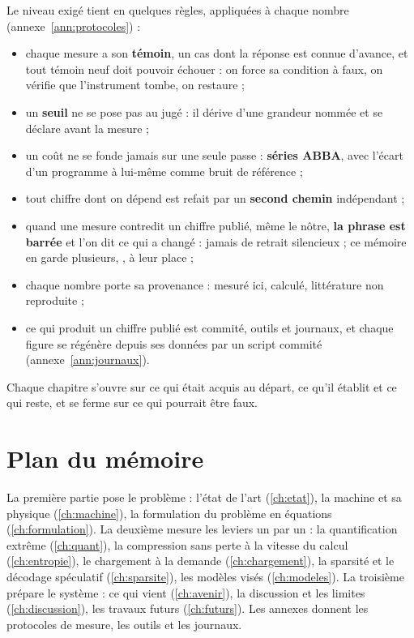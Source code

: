 Le niveau exigé tient en quelques règles, appliquées à chaque nombre (annexe~\ref{ann:protocoles}) :
\begin{itemize}
\item chaque mesure a son \textbf{témoin}, un cas dont la réponse est connue d'avance, et tout témoin neuf doit pouvoir échouer : on force sa condition à faux, on vérifie que l'instrument tombe, on restaure ;
\item un \textbf{seuil} ne se pose pas au jugé : il dérive d'une grandeur nommée et se déclare avant la mesure ;
\item un coût ne se fonde jamais sur une seule passe : \textbf{séries ABBA}, avec l'écart d'un programme à lui-même comme bruit de référence ;
\item tout chiffre dont on dépend est refait par un \textbf{second chemin} indépendant ;
\item quand une mesure contredit un chiffre publié, même le nôtre, \textbf{la phrase est barrée} et l'on dit ce qui a changé : jamais de retrait silencieux ; ce mémoire en garde plusieurs, , à leur place ;
\item chaque nombre porte sa provenance : \mes{} mesuré ici, \calc{} calculé, \litt{} littérature non reproduite ;
\item ce qui produit un chiffre publié est commité, outils et journaux, et chaque figure se régénère depuis ses données par un script commité (annexe~\ref{ann:journaux}).
\end{itemize}

Chaque chapitre s'ouvre sur ce qui était acquis au départ, ce qu'il établit et ce qui reste, et se ferme sur ce qui pourrait être faux.

\section{Plan du mémoire}

La première partie pose le problème : l'état de l'art (\cref{ch:etat}), la machine et sa physique (\cref{ch:machine}), la formulation du problème en équations (\cref{ch:formulation}). La deuxième mesure les leviers un par un : la quantification extrême (\cref{ch:quant}), la compression sans perte à la vitesse du calcul (\cref{ch:entropie}), le chargement à la demande (\cref{ch:chargement}), la sparsité et le décodage spéculatif (\cref{ch:sparsite}), les modèles visés (\cref{ch:modeles}). La troisième prépare le système : ce qui vient (\cref{ch:avenir}), la discussion et les limites (\cref{ch:discussion}), les travaux futurs (\cref{ch:futurs}). Les annexes donnent les protocoles de mesure, les outils et les journaux.
